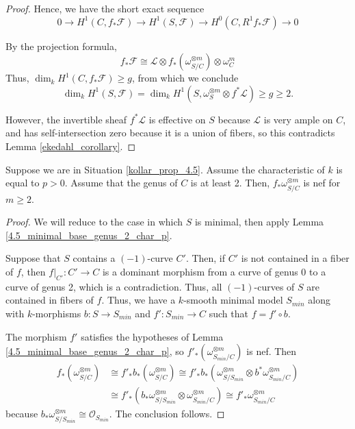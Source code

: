 \begin{proof}
Hence, we have the short exact sequence
$$0\to H^1(C, f_*\mathcal{F})\to H^1(S, \mathcal{F})\to H^0(C, R^1f_*\mathcal{F})\to 0$$

By the projection formula,
$$
f_*\mathcal{F}\cong\mathcal{L}\otimes f_*(\omega^{\otimes m}_{S/C})\otimes \omega^m_C
$$
Thus, $\dim_k H^1(C,f_{*}\mathcal{F})\ge g$, from which we conclude
$$
\dim_k H^1(S,\mathcal{F})=\dim_kH^{1}(S,\omega_{S}^{\otimes m}\otimes f^{*}\mathcal{L})\ge g\ge2.
$$

However, the invertible sheaf $f^*\mathcal{L}$ is effective on $S$ because $\mathcal{L}$ is very ample on $C$, and has self-intersection zero because it is a union of fibers, so this contradicts Lemma \ref{ekedahl_corollary}.
\end{proof}

\begin{lemma}\label{4.5_base_genus_2_char_p}
Suppose we are in Situation \ref{kollar_prop_4.5}.
Assume the characteristic of $k$ is equal to $p>0$.
Assume that the genus of $C$ is at least 2.
Then, $f_*\omega_{S/C}^{\otimes m}$ is nef for $m \geq 2$.
\end{lemma}

\begin{proof}
We will reduce to the case in which $S$ is minimal, then apply Lemma
\ref{4.5_minimal_base_genus_2_char_p}.

Suppose that $S$ contains a $(-1)$-curve $C'$.
Then, if $C'$ is not contained in a fiber of $f$, then $f|_{C'}:C'\to C$ is a
dominant morphism from a curve of genus 0 to a curve of genus 2, which is a
contradiction.
Thus, all $(-1)$-curves of $S$ are contained in fibers of $f$.
Thus, we have a $k$-smooth minimal model $S_{min}$ along with $k$-morphisms
$b:S\to S_{min}$ and $f':S_{min}\to C$ such that $f=f'\circ b$.

The morphism $f'$ satisfies the hypotheses of Lemma
\ref{4.5_minimal_base_genus_2_char_p}, so
$f'_*(\omega_{S_{min}/C}^{\otimes m})$ is nef.
Then
\begin{align*}
  f_*(\omega^{\otimes m}_{S/C})
    & \cong f'_*b_*(\omega^{\otimes m}_{S/C})
      \cong f'_*b_*(\omega^{\otimes m}_{S/S_{min}}\otimes b^*\omega^{\otimes m}_{S_{min}/C})\\
    & \cong f'_*(b_*\omega^{\otimes m}_{S/S_{min}}\otimes \omega^{\otimes m}_{S_{min}/C})
      \cong f'_*\omega^{\otimes m}_{S_{min}/C}
\end{align*}
because $b_*\omega^{\otimes m}_{S/S_{min}}\cong\mathcal{O}_{S_{min}}$.
The conclusion follows.
\end{proof}



